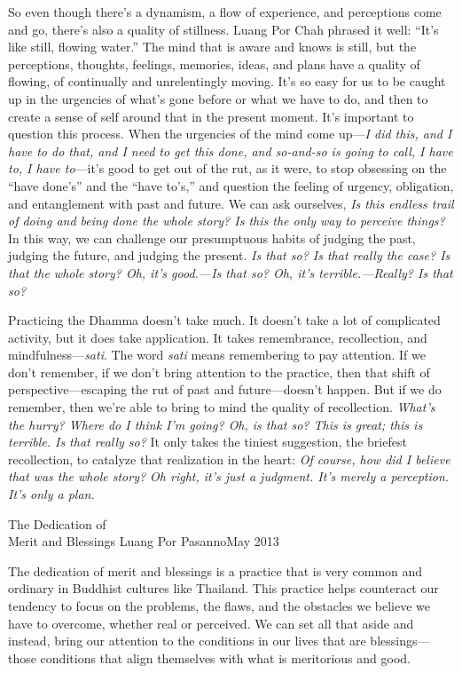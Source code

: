 So even though there's a dynamism, a flow of experience, and 
perceptions come and go, there's also a quality of stillness. Luang Por 
Chah phrased it well: ``It's like still, flowing water.'' The mind that 
is aware and knows is still, but the perceptions, thoughts, feelings, 
memories, ideas, and plans have a quality of flowing, of continually 
and unrelentingly moving. It's so easy for us to be caught up in the 
urgencies of what's gone before or what we have to do, and then to 
create a sense of self around that in the present moment. It's 
important to question this process. When the urgencies of the mind come 
up---\emph{I did this, and I have to do that, and I need to get this 
done, and so-and-so is going to call, I have to, I have to}---it's good 
to get out of the rut, as it were, to stop obsessing on the ``have 
done's'' and the ``have to's,'' and question the feeling of urgency, 
obligation, and entanglement with past and future. We can ask 
ourselves, \emph{Is this endless trail of doing and being done the 
whole story? Is this the only way to perceive things?} In this way, we 
can challenge our presumptuous habits of judging the past, judging the 
future, and judging the present. \emph{Is that so? Is that really the 
case? Is that the whole story? Oh, it's good.---Is that so? Oh, it's 
terrible.---Really? Is that so?}

Practicing the Dhamma doesn't take much. It doesn't take a lot of 
complicated activity, but it does take application. It takes 
remembrance, recollection, and mindfulness---\emph{sati}. The word 
\emph{sati} means remembering to pay attention. If we don't remember, 
if we don't bring attention to the practice, then that shift of 
perspective---escaping the rut of past and future---doesn't happen. But 
if we do remember, then we're able to bring to mind the quality of 
recollection. \emph{What's the hurry? Where do I think I'm going? Oh, 
is that so? This is great; this is terrible. Is that really so?} It 
only takes the tiniest suggestion, the briefest recollection, to 
catalyze that realization in the heart: \emph{Of course, how did I 
believe that was the whole story? Oh right, it's just a judgment. It's 
merely a perception. It's only a plan.}

{The Dedication of\\Merit and Blessings}
{Luang Por Pasanno}{May 2013}

The dedication of merit and blessings is a practice that is very common 
and ordinary in Buddhist cultures like Thailand. This practice helps 
counteract our tendency to focus on the problems, the flaws, and the 
obstacles we believe we have to overcome, whether real or perceived. We 
can set all that aside and instead, bring our attention to the 
conditions in our lives that are blessings---those conditions that 
align themselves with what is meritorious and good.

